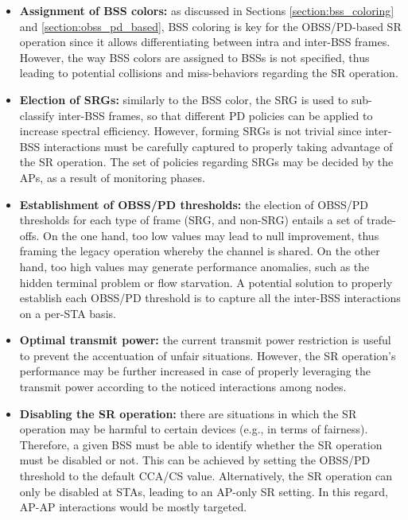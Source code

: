 \documentclass[preprint,12pt]{elsarticle}
\begin{document}
\begin{itemize}
	\item \textbf{Assignment of BSS colors:} as discussed in Sections \ref{section:bss_coloring} and \ref{section:obss_pd_based}, BSS coloring is key for the OBSS/PD-based SR operation since it allows differentiating between intra and inter-BSS frames. However, the way BSS colors are assigned to BSSs is not specified, thus leading to potential collisions and miss-behaviors regarding the SR operation.
	\item \textbf{Election of SRGs:} similarly to the BSS color, the SRG is used to sub-classify inter-BSS frames, so that different PD policies can be applied to increase spectral efficiency. However, forming SRGs is not trivial since inter-BSS interactions must be carefully captured to properly taking advantage of the SR operation. The set of policies regarding SRGs may be decided by the APs, as a result of monitoring phases.%
	\item \textbf{Establishment of OBSS/PD thresholds:} the election of OBSS/PD thresholds for each type of frame (SRG, and non-SRG) entails a set of trade-offs. On the one hand, too low values may lead to null improvement, thus framing the legacy operation whereby the channel is shared. On the other hand, too high values may generate performance anomalies, such as the hidden terminal problem or flow starvation. A potential solution to properly establish each OBSS/PD threshold is to capture all the inter-BSS interactions on a per-STA basis.
	\item \textbf{Optimal transmit power:} the current transmit power restriction is useful to prevent the accentuation of unfair situations. However, the SR operation's performance may be further increased in case of properly leveraging the transmit power according to the noticed interactions among nodes.
	\item \textbf{Disabling the SR operation:} there are situations in which the SR operation may be harmful to certain devices (e.g., in terms of fairness). Therefore, a given BSS must be able to identify whether the SR operation must be disabled or not. This can be achieved by setting the OBSS/PD threshold to the default CCA/CS value. Alternatively, the SR operation can only be disabled at STAs, leading to an AP-only SR setting. In this regard, AP-AP interactions would be mostly targeted.
\end{itemize}
\end{document}
